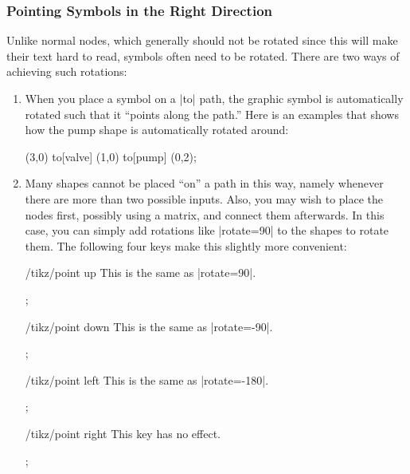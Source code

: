 \documentclass[a4paper]{ltxdoc}
\begin{document}
\subsubsection{Pointing Symbols in the Right Direction}

Unlike normal nodes, which generally should not be rotated since this
will make their text hard to read, symbols often need to be
rotated. There are two ways of achieving such rotations:

\begin{enumerate}
 \item When you place a symbol on a |to| path, the graphic symbol is
       automatically rotated such that it ``points along the path.'' Here
       is an examples that shows how the pump shape is automatically rotated around:
       \begin{codeexample}[]
        \draw (3,0) to[valve] (1,0) to[pump] (0,2);
       \end{codeexample}
 \item Many shapes cannot be placed ``on'' a path in this way, namely
       whenever there are more than two possible inputs. Also, you may wish
       to place the nodes first, possibly using a matrix, and connect them
       afterwards. In this case, you can simply add rotations like
       |rotate=90| to the shapes to rotate them. The following four keys
       make this slightly more convenient:
       \begin{key}{/tikz/point up}
        This is the same as |rotate=90|.
        \begin{codeexample}[]
          ;
        \end{codeexample}
       \end{key}
       \begin{key}{/tikz/point down}
        This is the same as |rotate=-90|.
        \begin{codeexample}[]
          ;
        \end{codeexample}
       \end{key}
       \begin{key}{/tikz/point left}
        This is the same as |rotate=-180|.
        \begin{codeexample}[]
          ;
        \end{codeexample}
       \end{key}
       \begin{key}{/tikz/point right}
        This key has no effect.
        \begin{codeexample}[]
          ;
        \end{codeexample}
       \end{key}
\end{enumerate}
\end{document}
